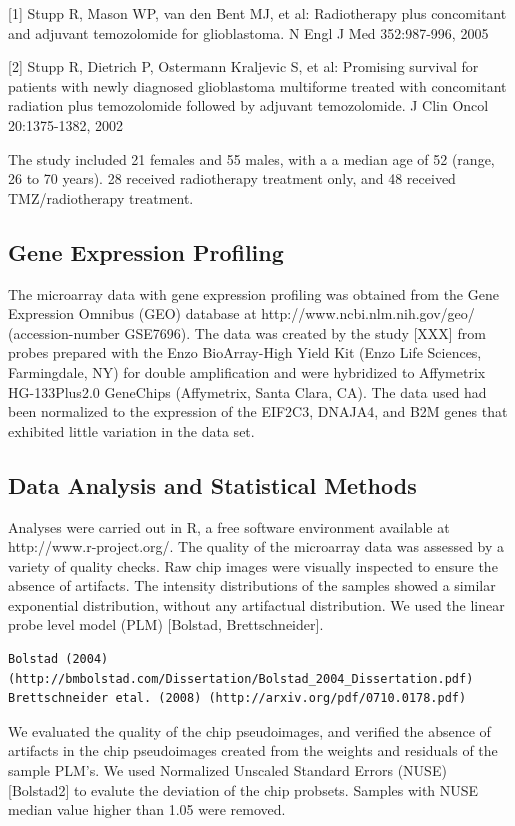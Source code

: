 \documentclass[9pt,twocolumn,twoside]{gsajnl}
\begin{document}
[1] Stupp R, Mason WP, van den Bent MJ, et al: Radiotherapy plus concomitant and adjuvant temozolomide for glioblastoma. N Engl J Med 352:987-996, 2005

[2] Stupp R, Dietrich P, Ostermann Kraljevic S, et al: Promising survival for patients with newly diagnosed glioblastoma multiforme treated with concomitant radiation plus temozolomide followed by adjuvant temozolomide. J Clin Oncol 20:1375-1382, 2002

The study included 21 females and 55 males, with a a median age of 52 (range, 26 to 70 years). 28 received radiotherapy treatment only, and 48 received TMZ/radiotherapy treatment.


\subsection*{Gene Expression Profiling}

The microarray data with gene expression profiling was obtained from the Gene Expression Omnibus (GEO) database at http://www.ncbi.nlm.nih.gov/geo/ (accession-number GSE7696). The data was created by the study [XXX] from probes prepared with the Enzo BioArray-High Yield Kit (Enzo Life Sciences, Farmingdale, NY) for double amplification and were hybridized to Affymetrix HG-133Plus2.0 GeneChips (Affymetrix, Santa Clara, CA). The data used had been normalized to the expression of the EIF2C3, DNAJA4, and B2M genes that exhibited little variation in the data set.

\subsection*{Data Analysis and Statistical Methods}

Analyses were carried out in R, a free software environment available at http://www.r-project.org/. The quality of the microarray data was assessed by a variety of quality checks. Raw chip images were visually inspected to ensure the absence of  artifacts. The intensity distributions of the samples showed a similar exponential distribution, without any artifactual distribution. We used the linear probe level model (PLM) [Bolstad, Brettschneider].

\begin{verbatim}
Bolstad (2004) (http://bmbolstad.com/Dissertation/Bolstad_2004_Dissertation.pdf)
Brettschneider etal. (2008) (http://arxiv.org/pdf/0710.0178.pdf)
\end{verbatim}

We evaluated the quality of the chip pseudoimages, and verified the absence of artifacts in the chip pseudoimages created from the weights and residuals of the sample PLM's. We used Normalized Unscaled Standard Errors (NUSE) [Bolstad2] to evalute the deviation of the chip probsets. Samples with NUSE median value higher than 1.05 were removed.
\end{document}
